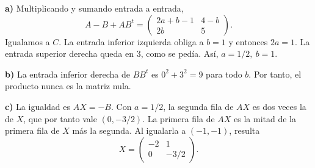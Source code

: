 \textbf{a)} Multiplicando y sumando entrada a entrada,
\[
A-B+AB^t=\begin{pmatrix}2a+b-1&4-b\\2b&5\end{pmatrix}.
\]
Igualamos a $C$. La entrada inferior izquierda obliga a $b=1$ y entonces $2a=1$. La entrada superior derecha queda en $3$, como se pedía. Así, $\boxed{a=1/2,\ b=1}$.

\textbf{b)} La entrada inferior derecha de $BB^t$ es $0^2+3^2=9$ para todo $b$. Por tanto, el producto nunca es la matriz nula.

\textbf{c)} La igualdad es $AX=-B$. Con $a=1/2$, la segunda fila de $AX$ es dos veces la de $X$, que por tanto vale $(0,-3/2)$. La primera fila de $AX$ es la mitad de la primera fila de $X$ más la segunda. Al igualarla a $(-1,-1)$, resulta
\[
X=\boxed{\begin{pmatrix}-2&1\\0&-3/2\end{pmatrix}}.
\]
